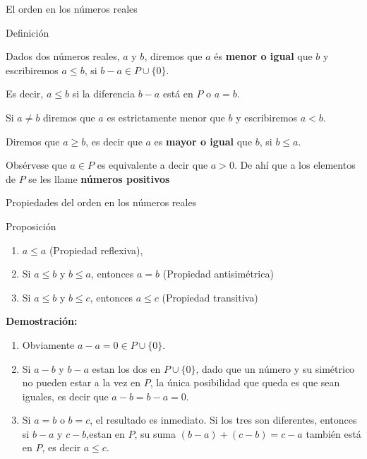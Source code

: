 \documentclass[ignorenonframetext,]{beamer}
\begin{document}
\begin{frame}{El orden en los números reales}
\protect\hypertarget{el-orden-en-los-nuxfameros-reales}{}

Definición

Dados dos números reales, \(a\) y \(b\), diremos que \(a\) és
\textbf{menor o igual} que \(b\) y escribiremos \(a \leq b\), si
\(b-a \in P \cup \{0\}\).

Es decir, \(a \leq b\) si la diferencia \(b-a\) está en \(P\) o \(a=b\).

Si \(a\neq b\) diremos que \(a\) es estrictamente menor que \(b\) y
escribiremos \(a<b\).

Diremos que \(a \geq b\), es decir que \(a\) es \textbf{mayor o igual}
que \(b\), si \(b \leq a\).

Obsérvese que \(a \in P\) es equivalente a decir que \(a > 0\). De ahí
que a los elementos de \(P\) se les llame \textbf{números positivos}

\end{frame}

\begin{frame}{Propiedades del orden en los números reales}
\protect\hypertarget{propiedades-del-orden-en-los-nuxfameros-reales}{}

Proposición

\begin{enumerate}
\item
  \(a \leq a\) (Propiedad reflexiva),
\item
  Si \(a \leq b\) y \(b \leq a\), entonces \(a=b\) (Propiedad
  antisimétrica)
\item
  Si \(a \leq b\) y \(b \leq c\), entonces \(a \leq c\) (Propiedad
  transitiva)
\end{enumerate}

\textbf{Demostración:}

\begin{enumerate}
\item
  Obviamente \(a-a=0 \in P \cup \{ 0\}\).
\item
  Si \(a-b\) y \(b-a\) estan los dos en \(P \cup \{ 0\}\), dado que un
  número y su simétrico no pueden estar a la vez en \(P\), la única
  posibilidad que queda es que sean iguales, es decir que \(a-b=b-a=0\).
\item
  Si \(a=b\) o \(b=c\), el resultado es inmediato. Si los tres son
  diferentes, entonces si \(b-a\) y \(c-b\),estan en \(P\), su suma
  \((b-a)+(c-b)=c-a\) también está en \(P\), es decir \(a \leq c\).
\end{enumerate}

\end{frame}
\end{document}
